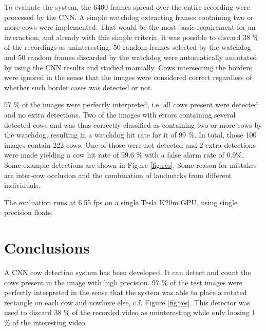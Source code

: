 \documentclass[10pt,a4paper,twocolumn]{article}
\begin{document}
To evaluate the system, the 6400 frames spread over the entire recording were processed by the CNN. A simple watchdog extracting frames containing two or more cows were implemented. That would be the most basic requirement for an interaction, and already with this simple criteria, it was possible to discard 38 \% of the recordings as uninteresting. 50 random frames selected by the watchdog and 50 random frames discarded by the watchdog were automatically annotated by using the CNN results and studied manually. Cows intersecting the borders were ignored in the sense that the images were considered correct regardless of whether such border cases was detected or not.

97 \% of the images were perfectly interpreted, i.e. all cows present were detected and no extra detections. Two of the images with errors containing several detected cows and was thus correctly classified as containing two or more cows by the watchdog, resulting in a watchdog hit rate for it of 99 \%. In total, those 100 images contain 222 cows. One of those were not detected and 2 extra detections were made yielding a cow hit rate of 99.6 \% with a false alarm rate of 0.9\%. Some example detections are shown in Figure \ref{fig:res}.
Some reason for mistakes are inter-cow occlusion and the combination of landmarks from different individuals.

The evaluation runs at 6.55 fps on a single Tesla K20m GPU, using single precision floats.

\section{Conclusions}

A CNN cow detection system has been developed. It can detect and count the cows present in the image with high precision. 97 \% of the test images were perfectly interpreted in the sense that the system was able to place a rotated rectangle on each cow and nowhere else, c.f. Figure \ref{fig:res}. This detector was used to discard 38 \% of the recorded video as uninteresting while only loosing 1 \% of the interesting video.


{\footnotesize

}
\end{document}
